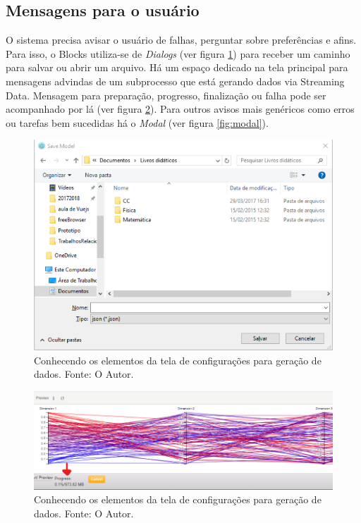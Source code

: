 \documentclass[
	12pt,				%
	openright,			%
	twoside,			%
	a4paper,			%
	english,			%
	brazil				%
	]{abntex2}
\begin{document}
		\subsection{Mensagens para o usuário}
		O sistema precisa avisar o usuário de falhas, perguntar sobre preferências e afins.
		Para isso, o Blocks utiliza-se de \emph{Dialogs} (ver figura \ref{fig:dialog}) para receber um caminho para salvar ou abrir um arquivo.
		Há um espaço dedicado na tela principal para mensagens advindas de um subprocesso que está gerando dados via Streaming Data.
		Mensagem para preparação, progresso, finalização ou falha pode ser acompanhado por lá (ver figura \ref{fig:SDvisor}).
		Para outros avisos mais genéricos como erros ou tarefas bem sucedidas há o \emph{Modal} (ver figura \ref{fig:modal}).
		\begin{figure}[h]
			\centering
			\includegraphics[width=\linewidth]{./figures/prototipo/dialog.png}
			\caption{Conhecendo os elementos da tela de configurações para geração de dados. Fonte: O Autor.}
			\label{fig:dialog}
		\end{figure}
		\begin{figure}[h]
			\centering
			\includegraphics[width=\linewidth]{./figures/prototipo/SDvisor.png}
			\caption{Conhecendo os elementos da tela de configurações para geração de dados. Fonte: O Autor.}
			\label{fig:SDvisor}
		\end{figure}
\end{document}
